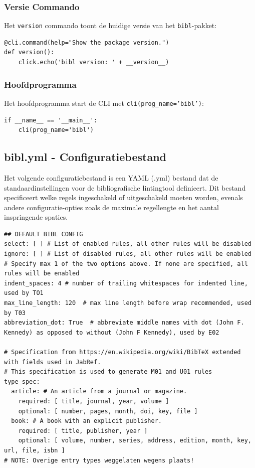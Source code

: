 \subsubsection{Versie Commando}

Het \texttt{version} commando toont de huidige versie van het \texttt{bibl}-pakket:

\begin{verbatim}
@cli.command(help="Show the package version.")
def version():
    click.echo('bibl version: ' + __version__)
\end{verbatim}

\subsubsection{Hoofdprogramma}

Het hoofdprogramma start de CLI met \texttt{cli(prog\_name='bibl')}:

\begin{verbatim}
if __name__ == '__main__':
    cli(prog_name='bibl')
\end{verbatim}
\subsection{bibl.yml - Configuratiebestand}
Het volgende configuratiebestand is een YAML (.yml) bestand dat de standaardinstellingen voor de bibliografische lintingtool definieert. Dit bestand specificeert welke regels ingeschakeld of uitgeschakeld moeten worden, evenals andere configuratie-opties zoals de maximale regellengte en het aantal inspringende spaties.

\begin{verbatim}
## DEFAULT BIBL CONFIG
select: [ ] # List of enabled rules, all other rules will be disabled
ignore: [ ] # List of disabled rules, all other rules will be enabled
# Specify max 1 of the two options above. If none are specified, all rules will be enabled
indent_spaces: 4 # number of trailing whitespaces for indented line, used by TO1
max_line_length: 120  # max line length before wrap recommended, used by T03
abbreviation_dot: True  # abbreviate middle names with dot (John F. Kennedy) as opposed to without (John F Kennedy), used by E02

# Specification from https://en.wikipedia.org/wiki/BibTeX extended with fields used in JabRef.
# This specification is used to generate M01 and U01 rules
type_spec:
  article: # An article from a journal or magazine.
    required: [ title, journal, year, volume ]
    optional: [ number, pages, month, doi, key, file ]
  book: # A book with an explicit publisher.
    required: [ title, publisher, year ]
    optional: [ volume, number, series, address, edition, month, key, url, file, isbn ]
# NOTE: Overige entry types weggelaten wegens plaats!
\end{verbatim}

